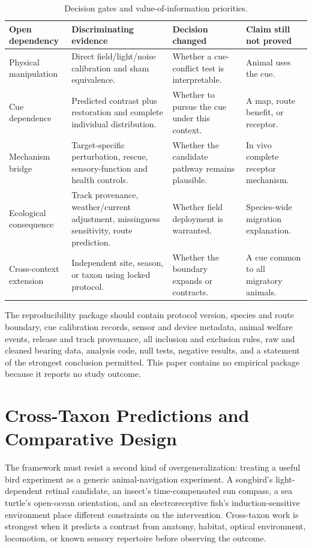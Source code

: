 \documentclass[conference]{IEEEtran}
\begin{document}
\begin{table}[!t]
\caption{Decision gates and value-of-information priorities.}\label{tab:gates}\centering\footnotesize
\begin{tabular}{@{}L{.18\textwidth}L{.27\textwidth}L{.27\textwidth}L{.20\textwidth}@{}}\toprule
Open dependency & Discriminating evidence & Decision changed & Claim still not proved\\\midrule
Physical manipulation & Direct field/light/noise calibration and sham equivalence. & Whether a cue-conflict test is interpretable. & Animal uses the cue.\\
Cue dependence & Predicted contrast plus restoration and complete individual distribution. & Whether to pursue the cue under this context. & A map, route benefit, or receptor.\\
Mechanism bridge & Target-specific perturbation, rescue, sensory-function and health controls. & Whether the candidate pathway remains plausible. & In vivo complete receptor mechanism.\\
Ecological consequence & Track provenance, weather/current adjustment, missingness sensitivity, route prediction. & Whether field deployment is warranted. & Species-wide migration explanation.\\
Cross-context extension & Independent site, season, or taxon using locked protocol. & Whether the boundary expands or contracts. & A cue common to all migratory animals.\\\bottomrule
\end{tabular}
\end{table}

The reproducibility package should contain protocol version, species and route boundary, cue calibration records, sensor and device metadata, animal welfare events, release and track provenance, all inclusion and exclusion rules, raw and cleaned bearing data, analysis code, null tests, negative results, and a statement of the strongest conclusion permitted. This paper contains no empirical package because it reports no study outcome.

\section{Cross-Taxon Predictions and Comparative Design}\label{sec:comparative}
The framework must resist a second kind of overgeneralization: treating a useful bird experiment as a generic animal-navigation experiment. A songbird's light-dependent retinal candidate, an insect's time-compensated sun compass, a sea turtle's open-ocean orientation, and an electroreceptive fish's induction-sensitive environment place different constraints on the intervention. Cross-taxon work is strongest when it predicts a contrast from anatomy, habitat, optical environment, locomotion, or known sensory repertoire before observing the outcome.
\end{document}

